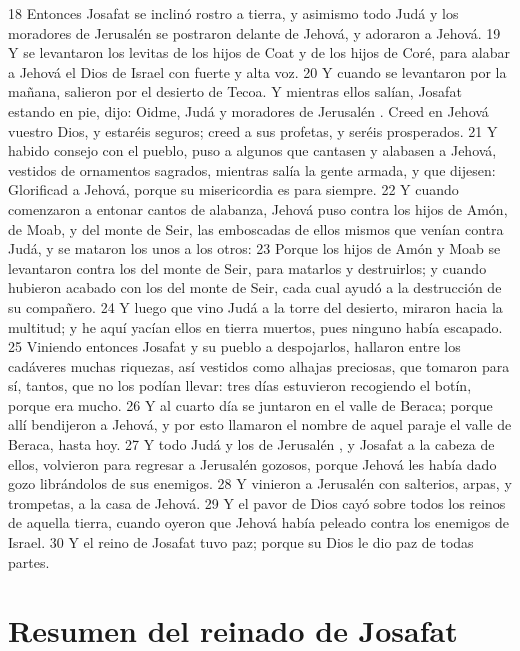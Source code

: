 18 Entonces Josafat se inclinó rostro a tierra, y asimismo todo Judá y los moradores de Jerusalén  se postraron delante de Jehová, y adoraron a Jehová.
19 Y se levantaron los levitas de los hijos de Coat y de los hijos de Coré, para alabar a Jehová el Dios de Israel con fuerte y alta voz.
20 Y cuando se levantaron por la mañana, salieron por el desierto de Tecoa. Y mientras ellos salían, Josafat estando en pie, dijo: Oidme, Judá y moradores de Jerusalén . Creed en Jehová vuestro Dios, y estaréis seguros; creed a sus profetas, y seréis prosperados.
21 Y habido consejo con el pueblo, puso a algunos que cantasen y alabasen a Jehová, vestidos de ornamentos sagrados, mientras salía la gente armada, y que dijesen: Glorificad a Jehová, porque su misericordia es para siempre.
22 Y cuando comenzaron a entonar cantos de alabanza, Jehová puso contra los hijos de Amón, de Moab, y del monte de Seir, las emboscadas de ellos mismos que venían contra Judá, y se mataron los unos a los otros:
23 Porque los hijos de Amón y Moab se levantaron contra los del monte de Seir, para matarlos y destruirlos; y cuando hubieron acabado con los del monte de Seir, cada cual ayudó a la destrucción de su compañero.
24 Y luego que vino Judá a la torre del desierto, miraron hacia la multitud; y he aquí yacían ellos en tierra muertos, pues ninguno había escapado.
25 Viniendo entonces Josafat y su pueblo a despojarlos, hallaron entre los cadáveres  muchas riquezas, así vestidos como alhajas preciosas, que tomaron para sí, tantos, que no los podían llevar: tres días estuvieron recogiendo el botín, porque era mucho.
26 Y al cuarto día se juntaron en el valle de Beraca; porque allí bendijeron a Jehová, y por esto llamaron el nombre de aquel paraje el valle de Beraca, hasta hoy.
27 Y todo Judá y los de Jerusalén , y Josafat a la cabeza de ellos, volvieron para regresar a Jerusalén  gozosos, porque Jehová les había dado gozo librándolos de sus enemigos.
28 Y vinieron a Jerusalén  con salterios, arpas, y trompetas, a la casa de Jehová.
29 Y el pavor de Dios cayó sobre todos los reinos de aquella tierra, cuando oyeron que Jehová había peleado contra los enemigos de Israel.
30 Y el reino de Josafat tuvo paz; porque su Dios le dio paz de todas partes.
\section*{Resumen del reinado de Josafat}


